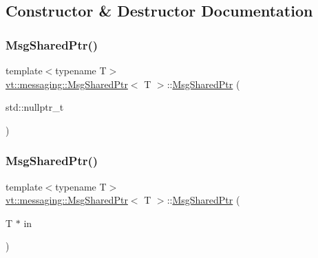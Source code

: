 \subsection{Constructor \& Destructor Documentation}
\mbox{\label{structvt_1_1messaging_1_1_msg_shared_ptr_a560ea1c81555ee5ea06efaa86445ba1b}} 
\subsubsection{\texorpdfstring{Msg\+Shared\+Ptr()}{MsgSharedPtr()}\hspace{0.1cm}{\footnotesize\ttfamily [1/5]}}
{\footnotesize\ttfamily template$<$typename T$>$ \\
\hyperlink{structvt_1_1messaging_1_1_msg_shared_ptr}{vt\+::messaging\+::\+Msg\+Shared\+Ptr}$<$ T $>$\+::\hyperlink{structvt_1_1messaging_1_1_msg_shared_ptr}{Msg\+Shared\+Ptr} (\begin{DoxyParamCaption}\item[{std\+::nullptr\+\_\+t}]{ }\end{DoxyParamCaption})\hspace{0.3cm}{\ttfamily [inline]}}

\mbox{\label{structvt_1_1messaging_1_1_msg_shared_ptr_a26e2fce2835b47a4035450b0f415db87}} 
\subsubsection{\texorpdfstring{Msg\+Shared\+Ptr()}{MsgSharedPtr()}\hspace{0.1cm}{\footnotesize\ttfamily [2/5]}}
{\footnotesize\ttfamily template$<$typename T$>$ \\
\hyperlink{structvt_1_1messaging_1_1_msg_shared_ptr}{vt\+::messaging\+::\+Msg\+Shared\+Ptr}$<$ T $>$\+::\hyperlink{structvt_1_1messaging_1_1_msg_shared_ptr}{Msg\+Shared\+Ptr} (\begin{DoxyParamCaption}\item[{T $\ast$}]{in }\end{DoxyParamCaption})\hspace{0.3cm}{\ttfamily [inline]}}

